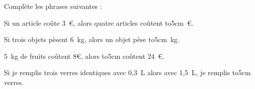 Complète les phrases suivantes :
\begin{myenumerate}
\item Si un article coûte 3~\textgreek{\euro}, alors quatre articles
coûtent \hbox to5cm{\dotfill}~\textgreek{\euro}.
\item Si trois objets pèsent 6~kg, alors un objet pèse \hbox
to5cm{\dotfill}~kg.
\item 5~kg de fruits coûtent 8\textgreek{\euro}, alors \hbox
to5cm{\dotfill} coûtent 24~\textgreek{\euro}.
\item Si je remplis trois verres identiques avec 0,3~L alors avec
1,5~L, je remplis \hbox to5cm{\dotfill} verres.
\end{myenumerate}
